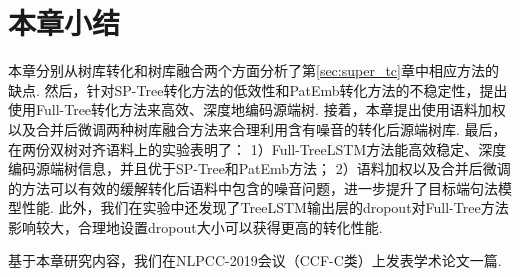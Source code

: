 

\section{本章小结}
本章分别从树库转化和树库融合两个方面分析了第\ref{sec:super_tc}章中相应方法的缺点. 然后，针对SP-Tree转化方法的低效性和PatEmb转化方法的不稳定性，提出使用Full-Tree转化方法来高效、深度地编码源端树. 接着，本章提出使用语料加权以及合并后微调两种树库融合方法来合理利用含有噪音的转化后源端树库. 最后，在两份双树对齐语料上的实验表明了：
1）Full-TreeLSTM方法能高效稳定、深度编码源端树信息，并且优于SP-Tree和PatEmb方法；
2）语料加权以及合并后微调的方法可以有效的缓解转化后语料中包含的噪音问题，进一步提升了目标端句法模型性能.
此外，我们在实验中还发现了TreeLSTM输出层的dropout对Full-Tree方法影响较大，合理地设置dropout大小可以获得更高的转化性能.

基于本章研究内容，我们在NLPCC-2019会议（CCF-C类）上发表学术论文一篇.



